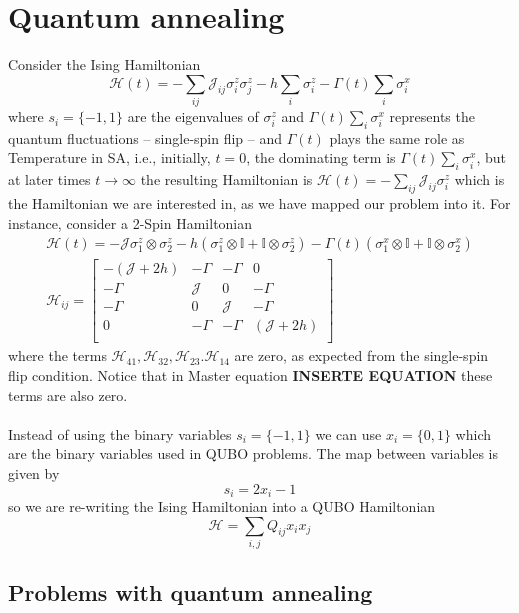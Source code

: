 \section{Quantum annealing}
Consider the Ising Hamiltonian
\begin{equation}
    \mathcal{H}(t) = -\sum_{ij}\mathcal{J}_{ij}\sigma_{i}^{z}\sigma_{j}^{z} - h\sum_{i}\sigma_{i}^{z} - \Gamma(t)\sum_{i}\sigma_{i}^{x}
\end{equation}
where $s_{i} = \{-1,1\}$ are the eigenvalues of $\sigma_{i}^{z}$ and $\Gamma(t)\sum_{i}\sigma_{i}^{x}$ represents the quantum fluctuations -- single-spin flip -- and $\Gamma(t)$ plays the same role as Temperature in SA, i.e., initially, $t=0$, the dominating term is $\Gamma(t)\sum_{i}\sigma_{i}^{x}$, but at later times $t \rightarrow \infty$ the resulting Hamiltonian is $\mathcal{H}(t) = -\sum_{ij}\mathcal{J}_{ij}\sigma_{i}^{z}$ which is the Hamiltonian we are interested in, as we have mapped our problem into it. For instance, consider a 2-Spin Hamiltonian
\begin{align}
    \mathcal{H}(t) = -\mathcal{J}\sigma_{1}^{z}\otimes \sigma_{2}^{z} - h\left(\sigma_{1}^{z}\otimes \mathbb{I} + \mathbb{I}\otimes \sigma_{2}^{z}\right) - \Gamma(t) \left(\sigma_{1}^{x}\otimes\mathbb{I} + \mathbb{I}\otimes \sigma_{2}^{x}\right)\\
    \mathcal{H}_{ij}= \begin{bmatrix}
        -\left(\mathcal{J} + 2h\right) & -\Gamma & -\Gamma & 0 \\
        -\Gamma & \mathcal{J} & 0 & -\Gamma \\
        -\Gamma & 0 & \mathcal{J} & -\Gamma \\
        0 & -\Gamma & -\Gamma & \left(\mathcal{J} + 2h\right) \\
    \end{bmatrix}
\end{align}
where the terms $\mathcal{H}_{41},\mathcal{H}_{32}, \mathcal{H}_{23}. \mathcal{H}_{14}$ are zero, as expected from the single-spin flip condition. Notice that in Master equation \textbf{INSERTE EQUATION} these terms are also zero.\\\\
Instead of using the binary variables $s_{i} = \{-1,1\}$ we can use $x_{i} = \{0,1\}$ which are the binary variables used in QUBO problems. The map between variables is given by
\begin{equation}
    s_{i} = 2x_{i} -1
\end{equation}
so we are re-writing the Ising Hamiltonian into a QUBO Hamiltonian
\begin{equation}
    \mathcal{H} = \sum_{i,j}Q_{ij}x_{i}x_{j}
\end{equation}
\subsection{Problems with quantum annealing}
